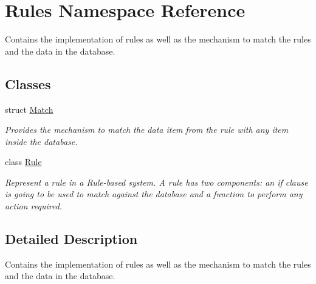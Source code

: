 \hypertarget{namespaceRules}{}\section{Rules Namespace Reference}
\label{namespaceRules}


Contains the implementation of rules as well as the mechanism to match the rules and the data in the database.  


\subsection*{Classes}
\begin{DoxyCompactItemize}
\item 
struct \hyperlink{structRules_1_1Match}{Match}
\begin{DoxyCompactList}\small\item\em Provides the mechanism to match the data item from the rule with any item inside the database. \end{DoxyCompactList}\item 
class \hyperlink{classRules_1_1Rule}{Rule}
\begin{DoxyCompactList}\small\item\em Represent a rule in a Rule-\/based system. A rule has two components\+: an if clause is going to be used to match against the database and a function to perform any action required. \end{DoxyCompactList}\end{DoxyCompactItemize}


\subsection{Detailed Description}
Contains the implementation of rules as well as the mechanism to match the rules and the data in the database. 